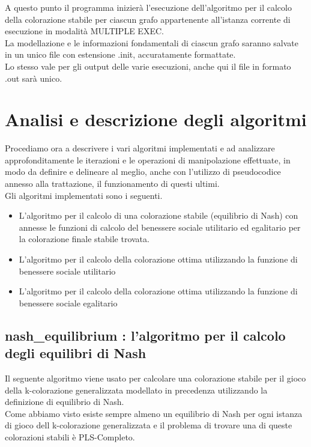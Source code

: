 A questo punto il programma inizierà l'esecuzione dell'algoritmo per il calcolo della colorazione stabile per ciascun grafo appartenente all'istanza corrente di esecuzione in modalità MULTIPLE EXEC.\\
La modellazione e le informazioni fondamentali di ciascun grafo saranno salvate in un unico file con estensione .init, accuratamente formattate.\\
Lo stesso vale per gli output delle varie esecuzioni, anche qui il file in formato .out sarà unico.\\

\section{Analisi e descrizione degli algoritmi}
\justify

Procediamo ora a descrivere i vari algoritmi implementati e ad analizzare approfonditamente le iterazioni e le operazioni di manipolazione effettuate, in modo da definire e delineare al meglio, anche con l'utilizzo di pseudocodice annesso alla trattazione, il funzionamento di questi ultimi.\\

Gli algoritmi implementati sono i seguenti.

\begin{itemize}
	\item L'algoritmo per il calcolo di una colorazione stabile (equilibrio di Nash) con annesse le funzioni di calcolo del benessere sociale utilitario ed egalitario per la colorazione finale stabile trovata.
	\item L'algoritmo per il calcolo della colorazione ottima utilizzando la funzione di benessere sociale utilitario 
	\item L'algoritmo per il calcolo della colorazione ottima utilizzando la funzione di benessere sociale egalitario 
\end{itemize}


\newpage
\subsection{nash\_equilibrium : l'algoritmo per il calcolo degli equilibri di Nash}
\justify
Il seguente algoritmo viene usato per calcolare una colorazione stabile per il gioco della k-colorazione generalizzata modellato in precedenza utilizzando la definizione di equilibrio di Nash.\\

Come abbiamo visto esiste sempre almeno un equilibrio di Nash per ogni istanza di gioco dell k-colorazione generalizzata e il problema di trovare una di queste colorazioni stabili è PLS-Completo.\\


